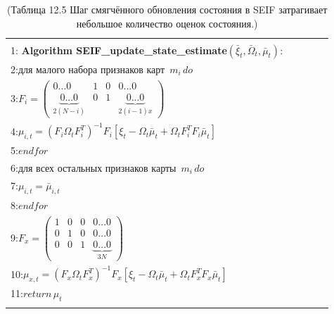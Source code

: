 \documentclass[10pt,a4paper]{article}
\begin{document}
\begin{table}[H]
\begin{center}
\begin{tabular}{|l|}
\hline
{}\\
1:\textbf{ Algorithm SEIF\_update\_state\_estimate}$(\bar{\xi}_t,\bar{\varOmega}_t,\bar{\mu}_t):\qquad\qquad$\\
2:\hspace{5mm}$\textit{для малого набора признаков карт }\,m_i\,\textit{do}$\\
3:\hspace{10mm}$F_i=\left(\begin{array}{cccc}
0...0&1&0&0...0\\\underbrace{0...0}_{2(N-i)}&0&1&\underbrace{0...0}_{2(i-1)x}\end{array} \right)$\\
4:\hspace{10mm}$\mu_{i,t}=(F_i\varOmega_tF_i^T)^{-1}F_i[\xi_t-\varOmega_t\bar{\mu}_t+\varOmega_tF_i^TF_i\bar{\mu}_t]$\\
5:\hspace{5mm}$\textit{endfor}$\\
6:\hspace{5mm}$\textit{для всех остальных признаков карты }\,m_i\,\textit{do}$\\
7:\hspace{10mm}$\mu_{i,t}=\bar{\mu}_{i,t}$\\
8:\hspace{5mm}$\textit{endfor}$\\
9:\hspace{5mm}$F_x=\left(\begin{array}{cccc}
1&0&0&0...0\\
0&1&0&0...0\\
0&0&1&\underbrace{0...0}_{3N}\end{array} \right)$\\
10:\hspace{4mm}$\mu_{x,t}=(F_x\varOmega_tF_x^T)^{-1}F_x[\xi_t-\varOmega_t\bar{\mu}_t+\varOmega_tF_x^TF_x\bar{\mu}_t]$\\
11:\hspace{4mm}$\textit{return}\,\mu_t$\\
{}\\
\hline
\end{tabular}
\caption{(Таблица 12.5 Шаг смягчённого обновления состояния в SEIF затрагивает небольшое количество оценок состояния.)}
\end{center}
\end{table}
\end{document}
